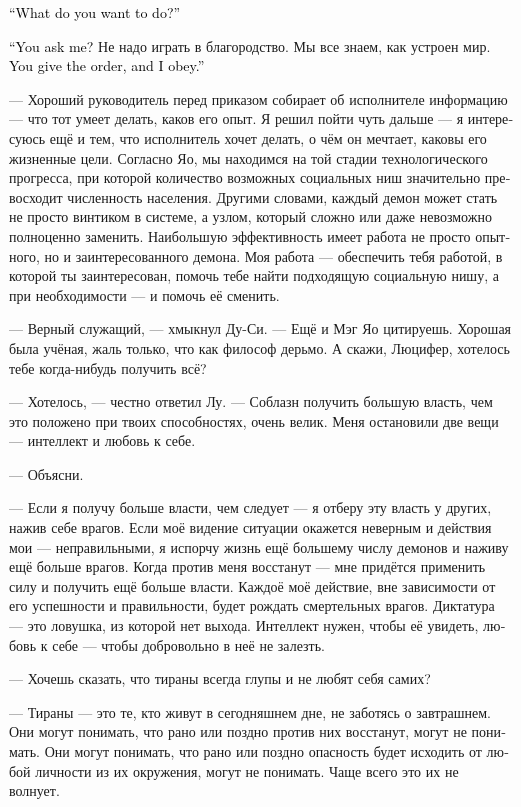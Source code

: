 \documentclass[a4paper,12pt,fleqn]{book}\usepackage{cooltooltips}\usepackage{polyglossia}\setdefaultlanguage[babelshorthands=true]{russian}\setotherlanguage{english}\defaultfontfeatures{Ligatures=TeX,Mapping=tex-text} \usepackage{xcolor}\definecolor{lightgray}{HTML}{bbbbbb}\color{lightgray}\newcommand{\ml}[3]{\textenglish{\textcolor{black}{#3}}}
\begin{document}
{\ml{$0$}
{--- Что ты хочешь делать?}
{``What do you want to do?''}

\ml{$0$}
{--- Ты спрашиваешь у меня?}
{``You ask me?}
Не надо играть в благородство.
Мы все знаем, как устроен мир.
\ml{$0$}
{Ты приказываешь --- я выполняю.}
{You give the order, and I obey.''}

--- Хороший руководитель перед приказом собирает об исполнителе информацию --- что тот умеет делать, каков его опыт.
Я решил пойти чуть дальше --- я интересуюсь ещё и тем, что исполнитель хочет делать, о чём он мечтает, каковы его жизненные цели.
Согласно Яо, мы находимся на той стадии технологического прогресса, при которой количество возможных социальных ниш значительно превосходит численность населения.
Другими словами, каждый демон может стать не просто винтиком в системе, а узлом, который сложно или даже невозможно полноценно заменить.
Наибольшую эффективность имеет работа не просто опытного, но и заинтересованного демона.
Моя работа --- обеспечить тебя работой, в которой ты заинтересован, помочь тебе найти подходящую социальную нишу, а при необходимости --- и помочь её сменить.

--- Верный служащий, --- хмыкнул Ду-Си.
--- Ещё и Мэг Яо цитируешь.
Хорошая была учёная, жаль только, что как философ дерьмо.
А скажи, Люцифер, хотелось тебе когда-нибудь получить всё?

--- Хотелось, --- честно ответил Лу.
--- Соблазн получить большую власть, чем это положено при твоих способностях, очень велик.
Меня остановили две вещи --- интеллект и любовь к себе.

--- Объясни.

--- Если я получу больше власти, чем следует --- я отберу эту власть у других, нажив себе врагов.
Если моё видение ситуации окажется неверным и действия мои --- неправильными, я испорчу жизнь ещё большему числу демонов и наживу ещё больше врагов.
Когда против меня восстанут --- мне придётся применить силу и получить ещё больше власти.
Каждоё моё действие, вне зависимости от его успешности и правильности, будет рождать смертельных врагов.
Диктатура --- это ловушка, из которой нет выхода.
Интеллект нужен, чтобы её увидеть, любовь к себе --- чтобы добровольно в неё не залезть.

--- Хочешь сказать, что тираны всегда глупы и не любят себя самих?

--- Тираны --- это те, кто живут в сегодняшнем дне, не заботясь о завтрашнем.
Они могут понимать, что рано или поздно против них восстанут, могут не понимать.
Они могут понимать, что рано или поздно опасность будет исходить от любой личности из их окружения, могут не понимать.
Чаще всего это их не волнует.

}
\end{document}

